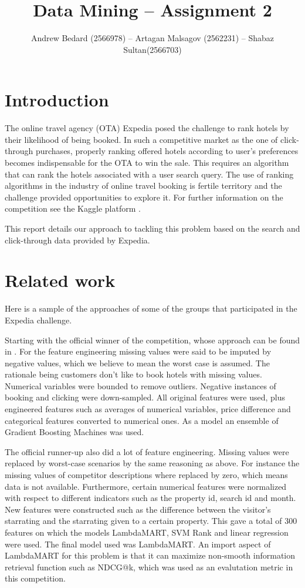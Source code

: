 \documentclass{llncs}
\title{Data Mining -- Assignment 2}
\author{Andrew Bedard (2566978) -- Artagan Malsagov (2562231)  -- Shabaz Sultan(2566703)}
\institute{}
\begin{document}
\maketitle
\section{Introduction}
The online travel agency (OTA) Expedia posed the challenge to rank hotels by their likelihood of being booked. In such a competitive market as the one of click-through purchases, properly ranking offered hotels according to user's preferences becomes indispensable for the OTA to win the sale. This requires an algorithm that can rank the hotels associated with a user search query. The use of ranking algorithms in the industry of online travel booking is fertile territory and the challenge provided opportunities to explore it. For further information on the competition see the Kaggle platform \cite{WinNT}.

This report details our approach to tackling this problem based on the search and click-through data provided by Expedia. 

\section{Related work}
Here is a sample of the approaches of some of the groups that participated in the Expedia challenge. 

Starting with the official winner of the competition, whose approach can be found in \cite{Zhang2013}. For the feature engineering missing values were said to be imputed by negative values, which we believe to mean the worst case is assumed. The rationale being customers don't like to book hotels with missing values. Numerical variables were bounded to remove outliers. Negative instances of booking and clicking were down-sampled. All original features were used, plus engineered features such as averages of numerical variables, price difference and categorical features converted to numerical ones. As a model an ensemble of Gradient Boosting Machines was used. 

The official runner-up also did a lot of feature engineering. Missing values were replaced by worst-case scenarios by the same reasoning as above. For instance the missing values of competitor descriptions where replaced by zero, which means data is not available. Furthermore, certain numerical features were normalized with respect to different indicators such as the property id, search id and month. New features were constructed such as the difference between the visitor's starrating and the starrating given to a certain property. This gave a total of 300 features on which the models LambdaMART, SVM Rank and linear regression were used. The final model used was LambdaMART. An import aspect of LambdaMART for this problem is that it can maximize non-smooth information retrieval function such as NDCG@k, which was used as an evalutation metric in this competition.
\end{document}
